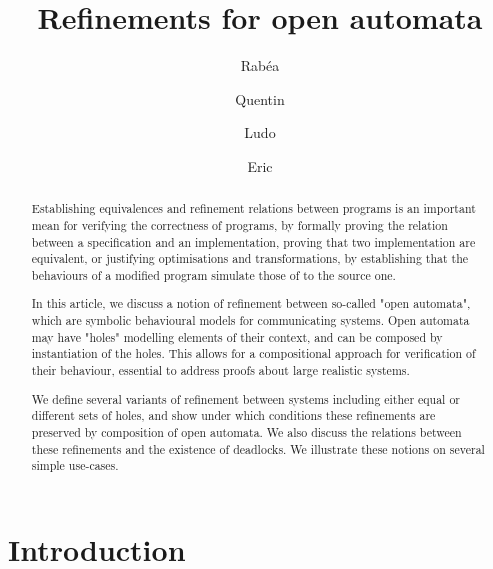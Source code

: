 \documentclass[runningheads]{llncs}
\begin{document}
%
\title{Refinements for open automata}
%
%
\author{
Rabéa \and
Quentin \and
Ludo \and
Eric}
%
%
%
\maketitle              %
%
\begin{abstract}

Establishing equivalences and refinement relations between programs is an important mean for 
verifying the correctness of programs, by formally proving the relation between a specification and an implementation, 
proving that two implementation are equivalent, or justifying optimisations and transformations, by establishing that the
behaviours of a modified program simulate those of to the source one.

In this article, we discuss a notion of refinement between so-called "open automata", which are symbolic
behavioural models for communicating systems. Open automata may have "holes" modelling elements of their
context, and can be composed by instantiation of the holes. This allows for a compositional approach for
verification of their behaviour, essential to address proofs about large realistic systems.

We define several variants of refinement between systems including either equal or different sets of holes, and 
show under which conditions these refinements are preserved by composition of open automata. We also discuss
the relations between these refinements and the existence of deadlocks.
We illustrate these notions on several simple use-cases.


\end{abstract}
%
%
%
\section{Introduction}
\end{document}
